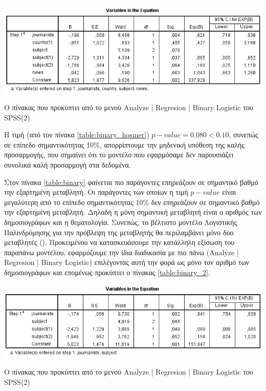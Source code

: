 \documentclass{assignment}
\begin{document}
\begin{Assignment}[Μέρος Ε]
\begin{table}[htbp]
\includegraphics[width=\textwidth]{images/table_binary.png}
\caption{Ο πίνακας που προκύπτει από το μενού Analyze | Regresion | Binary Logistic του SPSS(2) }
\label{table:binary}
\end{table}

Η τιμή (από τον πίνακα \ref{table:binary_hosmer}) $p-value = 0.080 < 0.10$, συνεπώς σε επίπεδο σημαντικότητας 10\%,  απορρίπτουμε την μηδενική υπόθεση της καλής προσαρμογής, που σημαίνει ότι το μοντέλο που εφαρμόσαμε δεν παρουσιάζει συνολικά καλή προσαρμογή στα δεδομένα.

Στον πίνακα \ref{table:binary} φαίνεται πιο παράγοντες επηρεάζουν σε σημαντικό βαθμό την εξαρτημένη μεταβλητή. Οι παράγοντες των οποίων η τιμή $p-value$ είναι μεγαλύτερη από το επίπεδο σημαντικότητας 10\% δεν επηρεάζουν σε σημαντικό βαθμό την εξαρτημένη μεταβλητή. Δηλαδή η μόνη σημαντική μεταβλητή είναι ο αριθμός των δημοσιογράφων και η θεματολογία.  Συνεπώς, το βέλτιστο μοντέλο Λογιστικής Παλινδρόμησης για την πρόβλεψη της μεταβλητής θα περιλαμβάνει μόνο δύο μεταβλητές (). Προκειμένου να κατασκευάσουμε την κατάλληλη εξίσωση του παραπάνω μοντέλου, εφαρμόζουμε την ίδια διαδικασία με πιο πάνω (Analyze | Regresion | Binary Logistic) επιλέγοντας αυτή την φορά ως  μόνο τον αριθμό των δημοσιογράφων και επομένως προκύπτει ο πίνακας \ref{table:binary_2}.

\begin{table}[htbp]
\includegraphics[width=\textwidth]{images/table_binary_2.png}
\caption{Ο πίνακας που προκύπτει από το μενού Analyze | Regresion | Binary Logistic του SPSS(2) }
\label{table:binary_2}
\end{table}


\end{Assignment}
\end{document}
